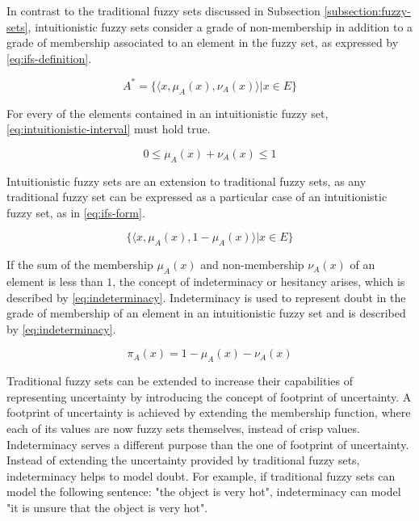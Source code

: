 In contrast to the traditional fuzzy sets discussed in Subsection
\ref{subsection:fuzzy-sets}, intuitionistic fuzzy sets consider a grade of
non-membership in addition to a grade of membership associated to an element in
the fuzzy set, as expressed by \ref{eq:ifs-definition}.


\begin{equation}
  \label{eq:ifs-definition}
  A^{*} = \{\langle x, \mu _{A} (x), \nu _{A} (x) \rangle | x \in E\}
\end{equation}

For every of the elements contained in an intuitionistic fuzzy set,
\ref{eq:intuitionistic-interval} must hold true.

\begin{equation}
  \label{eq:intuitionistic-interval}
  0 \leq \mu_{A}(x) + \nu_{A}(x) \leq 1
\end{equation}

Intuitionistic fuzzy sets are an extension to traditional fuzzy sets, as any
traditional fuzzy set can be expressed as a particular case of an intuitionistic
fuzzy set, as in \ref{eq:ifs-form}.

\begin{equation}
  \label{eq:ifs-form}
  \{ \langle x, \mu_{A}(x), 1 - \mu_{A}(x) \rangle | x \in E \}
\end{equation}

If the sum of the membership $\mu_{A}(x)$ and non-membership $\nu_{A}(x)$ of an
element is less than $1$, the concept of indeterminacy or hesitancy arises,
which is described by \ref{eq:indeterminacy}. Indeterminacy is used to represent
doubt in the grade of membership of an element in an intuitionistic fuzzy set
and is described by \ref{eq:indeterminacy}.

\begin{equation}
  \label{eq:indeterminacy}
  \pi_{A}(x) = 1 - \mu_{A}(x) - \nu_{A}(x)
\end{equation}

Traditional fuzzy sets can be extended to increase their capabilities of
representing uncertainty by introducing the concept of footprint of
uncertainty. A footprint of uncertainty is achieved by extending the membership
function, where each of its values are now fuzzy sets themselves, instead of
crisp values. Indeterminacy serves a different purpose than the one of footprint
of uncertainty. Instead of extending the uncertainty provided by traditional
fuzzy sets, indeterminacy helps to model doubt. For example, if traditional
fuzzy sets can model the following sentence: "the object is very hot",
indeterminacy can model "it is unsure that the object is very hot".

